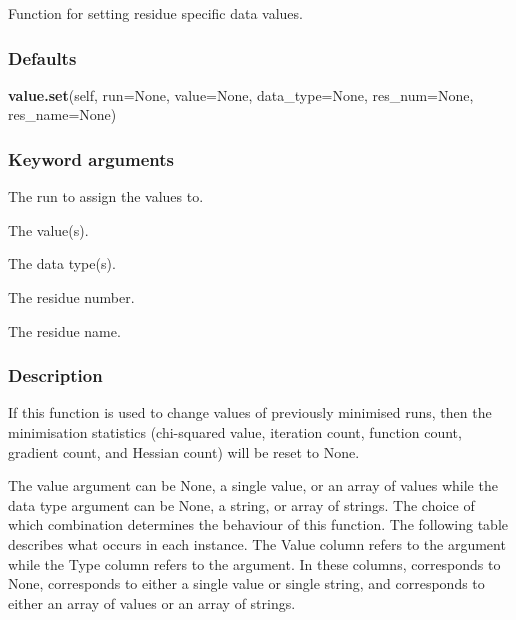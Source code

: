 Function for setting residue specific data values.

\subsubsection{Defaults}

\textsf{\textbf{value.set}(self, run=None, value=None, data\_type=None, res\_num=None, res\_name=None)}


\subsubsection{Keyword arguments}


  The run to assign the values to.

  The value(s).

  The data type(s).

  The residue number.

  The residue name.

\subsubsection{Description}

If this function is used to change values of previously minimised runs, then the
minimisation statistics (chi-squared value, iteration count, function count, gradient count,
and Hessian count) will be reset to None.


The value argument can be None, a single value, or an array of values while the data type
argument can be None, a string, or array of strings.  The choice of which combination
determines the behaviour of this function.  The following table describes what occurs in
each instance.  The Value column refers to the 
 argument while the Type column refers
to the 
 argument.  In these columns, 
 corresponds to None, 
 corresponds
to either a single value or single string, and 
 corresponds to either an array of values
or an array of strings.




